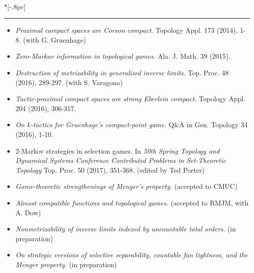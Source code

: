 \documentclass{article}
\newcommand{\headerText}[1]{
  \noindent{\large \bf #1} \\*[-.8pc]
  \rule{\textwidth}{.1pt}}
\begin{document}
\headerText{Papers}
\begin{itemize}
  \item
    \textit{Proximal compact spaces are Corson compact.}
    Topology Appl. 173 (2014), 1-8. (with G. Gruenhage)
  \item
    \textit{Zero-Markov information in topological games.}
    Ala. J. Math. 39 (2015).
  \item
    \textit{Destruction of metrizability in generalized inverse limits.}
    Top. Proc. 48 (2016), 289-297. (with S. Varagona)
  \item
    \textit{Tactic-proximal compact spaces are strong Eberlein compact.}
    Topology Appl. 204 (2016), 306-317.
  \item
    \textit{On \(k\)-tactics for Gruenhage's compact-point game.}
    Q\&A in Gen. Topology 34 (2016), 1-10.
  \item
    2-Markov strategies in selection games. In
    \textit{50th Spring Topology and Dynamical Systems Conference
    Contributed Problems in Set-Theoretic Topology}
    Top. Proc. 50 (2017), 351-368.
    (edited by Ted Porter)
  \item
    \textit{Game-theoretic strengthenings of Menger's property.}
    (accepted to CMUC)
  \item
    \textit{Almost compatible functions and topological games.}
    (accepted to RMJM, with A. Dow)
  \item
    \textit{Nonmetrizability of inverse limits indexed by uncountable total orders.}
    (in preparation)
  \item
    \textit{On strategic versions of selective separability, countable fan
    tightness, and the Menger property.}
    (in preparation)
\end{itemize}


\vfill
\end{document}
